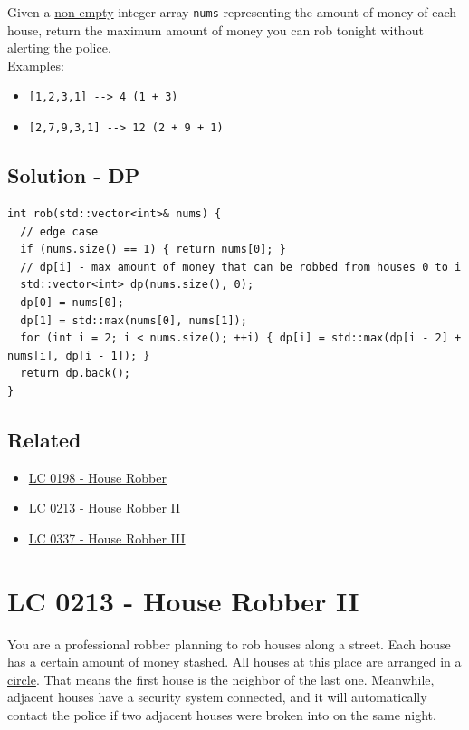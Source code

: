 Given a \ul{non-empty} integer array {\colorbox{CodeBackground}{\lstinline|nums|}} representing the amount of money of each house, return the maximum amount of money you can rob tonight without alerting the police.\\

Examples:
\begin{itemize}
\item {\colorbox{CodeBackground}{\lstinline|[1,2,3,1] --> 4 (1 + 3)|}}
\item {\colorbox{CodeBackground}{\lstinline|[2,7,9,3,1] --> 12 (2 + 9 + 1)|}}
\end{itemize}

\subsection*{Solution - DP}
\begin{lstlisting}
int rob(std::vector<int>& nums) {
  // edge case
  if (nums.size() == 1) { return nums[0]; }
  // dp[i] - max amount of money that can be robbed from houses 0 to i
  std::vector<int> dp(nums.size(), 0);
  dp[0] = nums[0];
  dp[1] = std::max(nums[0], nums[1]);
  for (int i = 2; i < nums.size(); ++i) { dp[i] = std::max(dp[i - 2] + nums[i], dp[i - 1]); }
  return dp.back();
}
\end{lstlisting}

\subsection*{Related}
\begin{itemize}
\item \hyperref[lc0198]{LC 0198 - House Robber}
\item \hyperref[lc0213]{LC 0213 - House Robber II}
\item \hyperref[lc0337]{LC 0337 - House Robber III}
\end{itemize}

\section{LC 0213 - House Robber II}\label{lc0213}
You are a professional robber planning to rob houses along a street. Each house has a certain amount of money stashed. All houses at this place are \ul{arranged in a circle}. That means the first house is the neighbor of the last one. Meanwhile, adjacent houses have a security system connected, and it will automatically contact the police if two adjacent houses were broken into on the same night.\\

